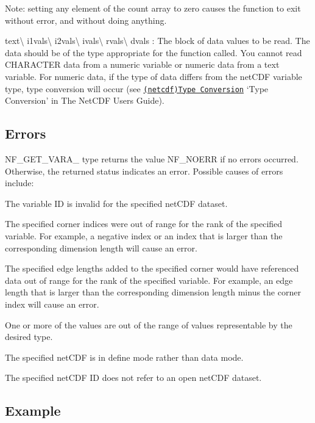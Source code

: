 Note\+: setting any element of the count array to zero causes the function to exit without error, and without doing anything.

{\ttfamily text}\textbackslash{} {\ttfamily i1vals}\textbackslash{} {\ttfamily i2vals}\textbackslash{} {\ttfamily ivals}\textbackslash{} {\ttfamily rvals}\textbackslash{} {\ttfamily dvals} \+: The block of data values to be read. The data should be of the type appropriate for the function called. You cannot read C\+H\+A\+R\+A\+C\+T\+ER data from a numeric variable or numeric data from a text variable. For numeric data, if the type of data differs from the net\+C\+DF variable type, type conversion will occur (see \href{netcdf.html#Type-Conversion}{\tt (netcdf)Type Conversion} ‘\+Type Conversion’ in The Net\+C\+DF Users Guide).

\subsection*{Errors }

N\+F\+\_\+\+G\+E\+T\+\_\+\+V\+A\+R\+A\+\_\+ type returns the value N\+F\+\_\+\+N\+O\+E\+RR if no errors occurred. Otherwise, the returned status indicates an error. Possible causes of errors include\+:


\begin{DoxyItemize}
\item The variable ID is invalid for the specified net\+C\+DF dataset.
\item The specified corner indices were out of range for the rank of the specified variable. For example, a negative index or an index that is larger than the corresponding dimension length will cause an error.
\item The specified edge lengths added to the specified corner would have referenced data out of range for the rank of the specified variable. For example, an edge length that is larger than the corresponding dimension length minus the corner index will cause an error.
\item One or more of the values are out of the range of values representable by the desired type.
\item The specified net\+C\+DF is in define mode rather than data mode.
\item The specified net\+C\+DF ID does not refer to an open net\+C\+DF dataset.
\end{DoxyItemize}

\subsection*{Example }

